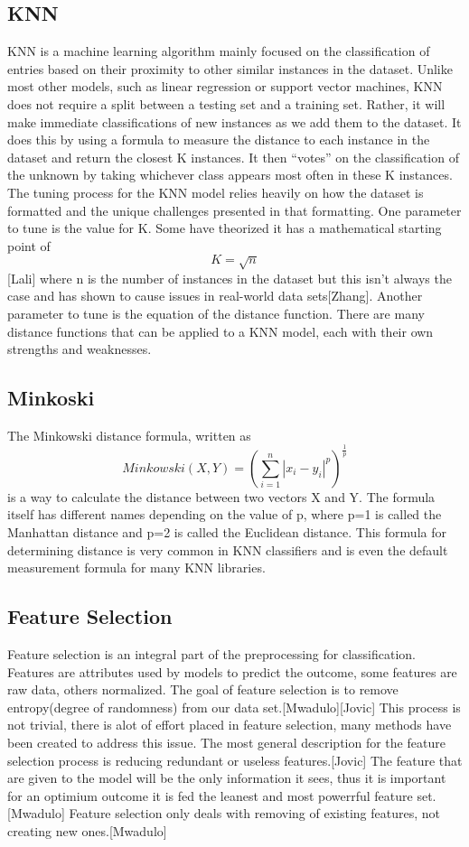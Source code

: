 \documentclass[confrence]{IEEEtran}
\begin{document}
\subsection*{KNN}
KNN is a machine learning algorithm mainly focused on the classification of entries based on their proximity to other similar instances in the dataset.
Unlike most other models, such as linear regression or support vector machines, KNN does not require a split between a testing set and a training set.
Rather, it will make immediate classifications of new instances as we add them to the dataset.
It does this by using a formula to measure the distance to each instance in the dataset and return the closest K instances. It then “votes” on the classification of the unknown by taking whichever class appears most often in these K instances.
The tuning process for the KNN model relies heavily on how the dataset is formatted and the unique challenges presented in that formatting.
One parameter to tune is the value for K.
Some have theorized it has a mathematical starting point of \[K = \sqrt{n}\][Lali] where n is the number of instances in the dataset but this isn't always the case and has shown to cause issues in real-world data sets[Zhang].
Another parameter to tune is the equation of the distance function.
There are many distance functions that can be applied to a KNN model, each with their own strengths and weaknesses.
\subsection*{Minkoski}
The Minkowski distance formula, written as \[ Minkowski(X,Y) = (\sum_{i=1}^n|x_i-y_i|^p)^\frac{1}{p}\] is a way to calculate the distance between two vectors X and Y. 
The formula itself has different names depending on the value of p, where p=1 is called the Manhattan distance and p=2 is called the Euclidean distance. 
This formula for determining distance is very common in KNN classifiers and is even the default measurement formula for many KNN libraries. 
\subsection*{Feature Selection}
Feature selection is an integral part of the preprocessing for classification. 
Features are attributes used by models to predict the outcome, some features are raw data, others normalized.
The goal of feature selection is to remove entropy(degree of randomness) from our data set.[Mwadulo][Jovic]
This process is not trivial, there is alot of effort placed in feature selection, many methods have been created to address this issue.
The most general description for the feature selection process is reducing redundant or useless features.[Jovic]
The feature that are given to the model will be the only information it sees, thus it is important for an optimium outcome it is fed the leanest and most powerrful feature set.[Mwadulo]
Feature selection only deals with removing of existing features, not creating new ones.[Mwadulo]
\end{document}
